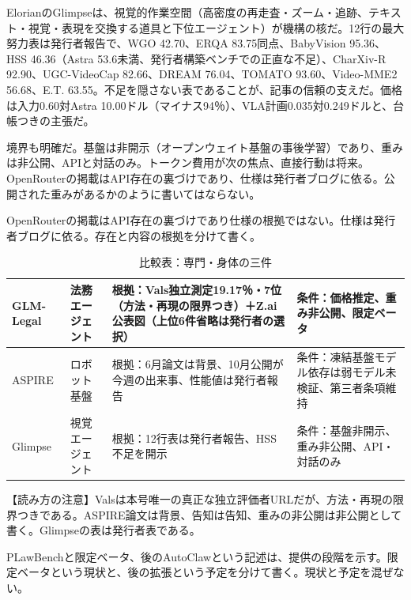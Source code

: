 \documentclass[lualatex,a4paper,10pt]{jlreq}
\begin{document}
ElorianのGlimpseは、視覚的作業空間（高密度の再走査・ズーム・追跡、テキスト・視覚・表現を交換する道具と下位エージェント）が機構の核だ。12行の最大努力表は発行者報告で、WGO 42.70、ERQA 83.75同点、BabyVision 95.36、HSS 46.36（Astra 53.6未満、発行者構築ベンチでの正直な不足）、CharXiv-R 92.90、UGC-VideoCap 82.66、DREAM 76.04、TOMATO 93.60、Video-MME2 56.68、E.T. 63.55。不足を隠さない表であることが、記事の信頼の支えだ。価格は入力0.60対Astra 10.00ドル（マイナス94％）、VLA計画0.035対0.249ドルと、台帳つきの主張だ。
\cite{B58,B59}


境界も明確だ。基盤は非開示（オープンウェイト基盤の事後学習）であり、重みは非公開、APIと対話のみ。トークン費用が次の焦点、直接行動は将来。OpenRouterの掲載はAPI存在の裏づけであり、仕様は発行者ブログに依る。公開された重みがあるかのように書いてはならない。
\cite{B58,B59}


OpenRouterの掲載はAPI存在の裏づけであり仕様の根拠ではない。仕様は発行者ブログに依る。存在と内容の根拠を分けて書く。
\cite{B58,B59}


\begin{table}[htbp]\centering\footnotesize
\caption{比較表：専門・身体の三件}
\begin{tabularx}{0.96\linewidth}{@{}lXXX@{}}
\toprule
GLM-Legal & 法務エージェント & 根拠：Vals独立測定19.17％・7位（方法・再現の限界つき）＋Z.ai公表図（上位6件省略は発行者の選択） & 条件：価格推定、重み非公開、限定ベータ \\
\midrule
ASPIRE & ロボット基盤 & 根拠：6月論文は背景、10月公開が今週の出来事、性能値は発行者報告 & 条件：凍結基盤モデル依存は弱モデル未検証、第三者条項維持 \\
\midrule
Glimpse & 視覚エージェント & 根拠：12行表は発行者報告、HSS不足を開示 & 条件：基盤非開示、重み非公開、API・対話のみ \\
\bottomrule
\end{tabularx}
\end{table}
\cite{B56,B58,B57,B59,B53,B54,B55}


\begin{tcolorbox}[colback=SurveySoft,colframe=SurveyRule,arc=1mm,boxrule=0.4pt,left=2mm,right=2mm]
【読み方の注意】Valsは本号唯一の真正な独立評価者URLだが、方法・再現の限界つきである。ASPIRE論文は背景、告知は告知、重みの非公開は非公開として書く。Glimpseの表は発行者表である。
\end{tcolorbox}
\cite{B56,B58,B57,B59,B53,B54,B55}


PLawBenchと限定ベータ、後のAutoClawという記述は、提供の段階を示す。限定ベータという現状と、後の拡張という予定を分けて書く。現状と予定を混ぜない。
\cite{B53,B54,B55}
\end{document}
